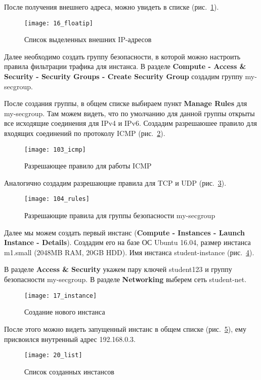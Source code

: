 После получения внешнего адреса, можно увидеть в списке (рис.~\ref{pic:float_ip}).
\begin{figure}[ht]
    \centering
    \texttt{[image: 16\_floatip]}
    \caption{Список выделенных внешних IP-адресов}\label{pic:float_ip}
\end{figure}

Далее необходимо создать группу безопасности, в которой можно настроить правила фильтрации трафика для инстанса.
В разделе \textbf{Compute - Access \& Security - Security Groups - Create Security Group} создадим группу my-secgroup.

После создания группы, в общем списке выбираем пункт \textbf{Manage Rules} для my-secgroup.
Там можем видеть, что по умолчанию для данной группы открыты все исходящие соединения для IPv4 и IPv6.
Создадим разрешаюшее правило для входящих соединений по протоколу ICMP (рис.~\ref{pic:icmp}).
\begin{figure}[ht]
    \centering
    \texttt{[image: 103\_icmp]}
    \caption{Разрешающее правило для работы ICMP}\label{pic:icmp}
\end{figure}

Аналогично создадим разрешающие правила для TCP и UDP (рис.~\ref{pic:rules}).
\begin{figure}[ht]
    \centering
    \texttt{[image: 104\_rules]}
    \caption{Разрешающие правила для группы безопасности my-secgroup}\label{pic:rules}
\end{figure}

\clearpage

Далее мы можем создать первый инстанс (\textbf{Compute - Instances - Launch Instance - Details}).
Создадим его на базе ОС Ubuntu 16.04, размер инстанса m1.small (2048MB RAM, 20GB HDD).
Имя инстанса student-instance (рис.~\ref{pic:instance}).

В разделе \textbf{Access \& Security} укажем пару ключей student123 и группу безопасности my-secgroup.
В разделе \textbf{Networking} выберем сеть student-net.
\begin{figure}[ht]
    \centering
    \texttt{[image: 17\_instance]}
    \caption{Создание нового инстанса}\label{pic:instance}
\end{figure}

После этого можно видеть запущенный инстанс в общем списке (рис.~\ref{pic:list}), ему присвоился внутренный адрес 192.168.0.3.
\begin{figure}[ht]
    \centering
    \texttt{[image: 20\_list]}
    \caption{Список созданных инстансов}\label{pic:list}
\end{figure}


